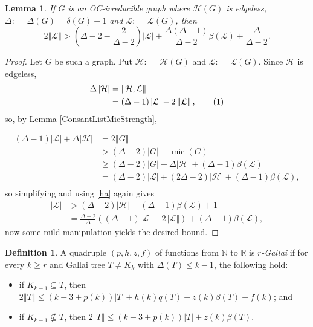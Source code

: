 \documentclass[12pt]{article}
\theoremstyle{plain}
\newtheorem{lem}[thm]{Lemma}
\theoremstyle{definition}
\newtheorem{defn}{Definition}
\theoremstyle{remark}
\newcommand{\fancy}[1]{\mathcal{#1}}
\newcommand{\IN}{\mathbb{N}}
\newcommand{\IR}{\mathbb{R}}
\renewcommand{\L}{\fancy{L}}
\newcommand{\HH}{\fancy{H}}
\newcommand{\card}[1]{\left|#1\right|}
\newcommand{\size}[1]{\left\Vert#1\right\Vert}
\newcommand{\parens}[1]{\left( #1 \right)}
\newcommand{\DefinedAs}{\mathrel{\mathop:}=}
\newcommand{\mic}{\operatorname{mic}}
\newcommand\numberthis{\addtocounter{equation}{1}\tag{\theequation}}
\begin{document}
\begin{lem}\label{LBound}
If $G$ is an OC-irreducible graph where $\HH(G)$ is edgeless, $\Delta \DefinedAs \Delta(G) = \delta(G) + 1$ and $\L\DefinedAs\L(G)$, then
\[2\size{\L} > \parens{\Delta-2 - \frac{2}{\Delta-2}}\card{\L} + \frac{\Delta(\Delta-1)}{\Delta-2}\beta(\L) + \frac{\Delta}{\Delta-2}.\]
\end{lem}
\begin{proof}
Let $G$ be such a graph. Put $\HH \DefinedAs \HH(G)$ and $\L \DefinedAs \L(G)$.  Since
$\HH$ is edgeless,
\begin{align*}
\Delta\card{\HH}&= \size{\HH, \L}\\
&=(\Delta-1)\card{\L} - 2\size{\L},\numberthis \label{ha}\\
\end{align*}
so, by Lemma \ref{ConsantListMicStrength},

\begin{align*}
(\Delta-1)\card{\L} + \Delta\card{\HH} &= 2\size{G}\\
&> (\Delta-2)\card{G} + \mic(G) \\
&\ge (\Delta-2)\card{G} + \Delta\card{\HH} + (\Delta-1)\beta(\L)\\
&= (\Delta-2)\card{\L} + (2\Delta-2)\card{\HH} + (\Delta-1)\beta(\L),\\
\end{align*}
so simplifying and using \eqref{ha} again gives
\begin{align*}
\card{\L} &> (\Delta-2)\card{\HH} + (\Delta-1)\beta(\L) + 1\\
&= \frac{\Delta-2}{\Delta}\parens{(\Delta-1)\card{\L} - 2\size{\L}} + (\Delta-1)\beta(\L),
\end{align*}
now some mild manipulation yields the desired bound. 
\end{proof}

\begin{defn}
A quadruple $\parens{p,h,z,f}$ of functions from $\IN$ to $\IR$ is \emph{$r$-Gallai} if for every $k \ge r$ and Gallai tree $T \ne K_k$ with $\Delta(T) \le k-1$,
the following hold:
\begin{itemize}
\item if $K_{k-1} \subseteq T$, then $2\size{T} \le \parens{k-3 + p(k)}\card{T} + h(k)q(T) + z(k)\beta(T) + f(k)$; and
\item if $K_{k-1} \not\subseteq T$, then $2\size{T} \le \parens{k-3 + p(k)}\card{T} + z(k)\beta(T)$.
\end{itemize}
\end{defn}
\end{document}
